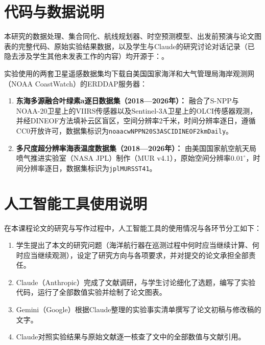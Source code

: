 \section{代码与数据说明}

本研究的数据处理、集合同化、航线规划器、时空预测模型、出发前预演与论文图表的完整代码、原始实验结果数据，以及学生与Claude的研究讨论对话记录（已隐去涉及学生其他未发表工作的内容）均开源于：。

实验使用的两套卫星遥感数据集均下载自美国国家海洋和大气管理局海岸观测网（NOAA CoastWatch）的ERDDAP服务器：
\begin{enumerate}
  \item \textbf{东海多源融合叶绿素a逐日数据集（2018—2026年）：} 融合了S-NPP与NOAA-20卫星上的VIIRS传感器以及Sentinel-3A卫星上的OLCI传感器观测，并经DINEOF方法填补云区盲区，空间分辨率2千米，时间分辨率逐日，遵循CC0开放许可，数据集标识为\texttt{noaacwNPPN20S3ASCIDINEOF2kmDaily}。
  \item \textbf{多尺度超分辨率海表温度数据集（2018—2026年）：} 由美国国家航空航天局喷气推进实验室（NASA JPL）制作（MUR v4.1），原始空间分辨率$0.01^\circ$，时间分辨率逐日，数据集标识为\texttt{jplMURSST41}。
\end{enumerate}

\section{人工智能工具使用说明}

在本课程论文的研究与写作过程中，人工智能工具的使用情况与各环节分工如下：
\begin{enumerate}
  \item 学生提出了本文的研究问题（海洋航行器在巡测过程中何时应当继续计算、何时应当继续观测），设定了研究方向与各项要求，并对提交的论文承担全部责任。
  \item Claude（Anthropic）完成了文献调研，与学生讨论细化了选题，编写了实验代码，运行了全部数值实验并绘制了论文图表。
  \item Gemini（Google）根据Claude整理的实验事实清单撰写了论文初稿与修改稿的文字。
  \item Claude对照实验结果与原始文献逐一核查了文中的全部数值与文献引用。
\end{enumerate}
